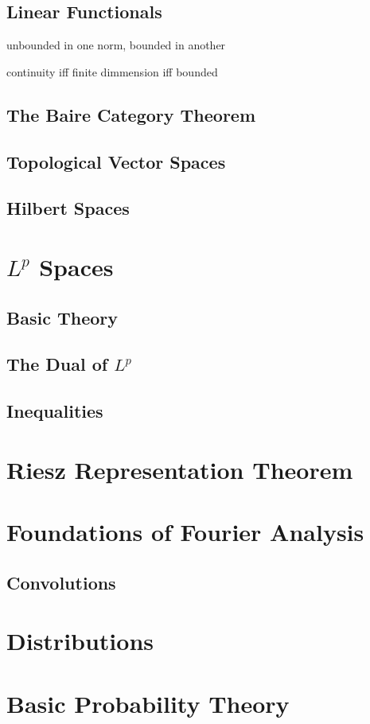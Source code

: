 \documentclass{article}
\theoremstyle{definition}
\begin{document}
	\subsection{Linear Functionals}
	unbounded in one norm, bounded in another %
	
	continuity iff finite dimmension iff bounded
	\subsection{The Baire Category Theorem}
	\subsection{Topological Vector Spaces}
	\subsection{Hilbert Spaces}
	\section{$ L^p $ Spaces}
	\subsection{Basic Theory}
	\subsection{The Dual of $ L^p $}
	\subsection{Inequalities}
	\section{Riesz Representation Theorem}
	\section{Foundations of Fourier Analysis}
	\subsection{Convolutions}
	\section{Distributions}
	\section{Basic Probability Theory}
	\newpage
	{} 
\end{document}
